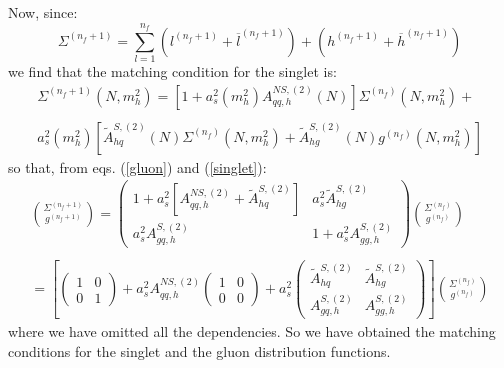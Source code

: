 \documentclass[10pt,a4paper]{article}
\begin{document}
Now, since:
\begin{equation}
\Sigma^{(n_f+1)}=\sum_{l=1}^{n_f}(l^{(n_f+1)}+\overline{l}^{(n_f+1)})+(h^{(n_f+1)}+\overline{h}^{(n_f+1)})
\end{equation}
we find that the matching condition for the singlet is:
\begin{equation}\label{singlet}
\begin{array}{c}
\displaystyle\Sigma^{(n_f+1)}(N,m_h^2)=[1+a_s^2(m_h^2)A_{qq,h}^{N\!S,(2)}(N)]\Sigma^{(n_f)}(N,m_h^2)+\\
\\
\displaystyle a_s^2(m_h^2)[\tilde{A}^{S,(2)}_{hq}(N)\Sigma^{(n_f)}(N,m_h^2)+\tilde{A}^{S,(2)}_{hg}(N)g^{(n_f)}(N,m_h^2)]
\end{array}
\end{equation}
so that, from eqs. (\ref{gluon}) and (\ref{singlet}):
\begin{equation}\label{couple1}
\begin{array}{c}
\displaystyle {\Sigma^{(n_f+1)} \choose g^{(n_f+1)}}=\begin{pmatrix}1+a_s^2[A_{qq,h}^{N\!S,(2)}+\tilde{A}^{S,(2)}_{hq}] & a_s^2\tilde{A}^{S,(2)}_{hg}\\
a_s^2A^{S,(2)}_{gq,h} & 1+a_s^2A_{gg,h}^{S,(2)}\end{pmatrix}{\Sigma^{(n_f)} \choose g^{(n_f)}}\\
\\
\displaystyle =\left[\begin{pmatrix} 1 & 0 \\ 0 & 1\end{pmatrix}+a_s^2A_{qq,h}^{N\!S,(2)}\begin{pmatrix} 1 & 0 \\ 0 & 0\end{pmatrix}+a_s^2\begin{pmatrix} \tilde{A}^{S,(2)}_{hq} & \tilde{A}^{S,(2)}_{hg} \\A^{S,(2)}_{gq,h} & A_{gg,h}^{S,(2)}\end{pmatrix}\right]{\Sigma^{(n_f)} \choose g^{(n_f)}}
\end{array}
\end{equation}
where we have omitted all the dependencies. So we have obtained the
matching conditions for the singlet and the gluon distribution
functions.
\end{document}
